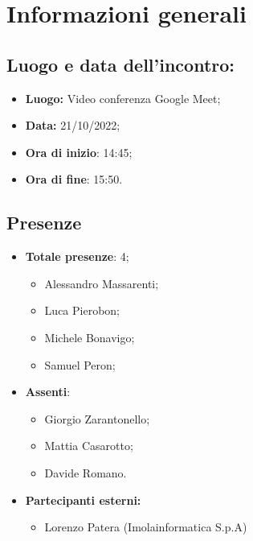 \section{Informazioni generali}

\subsection{Luogo e data dell'incontro:}
\begin{itemize}
    \item \textbf{Luogo:} Video conferenza Google Meet;
    \item \textbf{Data:} 21/10/2022;
    \item \textbf{Ora di inizio}: 14:45;
    \item \textbf{Ora di fine}: 15:50.
\end{itemize}
\subsection{Presenze}
\begin{itemize}
    \item \textbf{Totale presenze}: 4;
    \begin{itemize}
        \item Alessandro Massarenti;
        \item Luca Pierobon;
        \item Michele Bonavigo;
        \item Samuel Peron;
    \end{itemize}
    \item \textbf{Assenti}:
    \begin{itemize}
        \item Giorgio Zarantonello;
        \item Mattia Casarotto;
        \item Davide Romano.
    \end{itemize}
    \item \textbf{Partecipanti esterni:}
    \begin{itemize}
        \item Lorenzo Patera (Imolainformatica S.p.A)
    \end{itemize}
\end{itemize}

